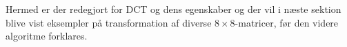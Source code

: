 Hermed er der redegjort for DCT og dens egenskaber og der vil i næste sektion blive vist eksempler på transformation af diverse $8\times8$-matricer, før den videre algoritme forklares.

